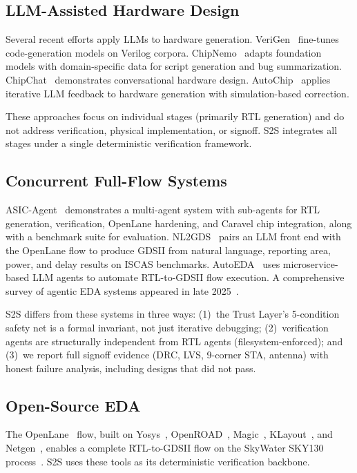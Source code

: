 \documentclass[journal]{IEEEtran}
\begin{document}
\subsection{LLM-Assisted Hardware Design}

Several recent efforts apply LLMs to hardware generation. VeriGen~\cite{thakur2024verigen} fine-tunes code-generation models on Verilog corpora. ChipNemo~\cite{liu2023chipnemo} adapts foundation models with domain-specific data for script generation and bug summarization. ChipChat~\cite{blocklove2023chipchat} demonstrates conversational hardware design. AutoChip~\cite{thakur2023autochip} applies iterative LLM feedback to hardware generation with simulation-based correction.

These approaches focus on individual stages (primarily RTL generation) and do not address verification, physical implementation, or signoff. S2S integrates all stages under a single deterministic verification framework.

\subsection{Concurrent Full-Flow Systems}

ASIC-Agent~\cite{asicagent2025} demonstrates a multi-agent system with sub-agents for RTL generation, verification, OpenLane hardening, and Caravel chip integration, along with a benchmark suite for evaluation. NL2GDS~\cite{nl2gds2026} pairs an LLM front end with the OpenLane flow to produce GDSII from natural language, reporting area, power, and delay results on ISCAS benchmarks. AutoEDA~\cite{autoeda2025} uses microservice-based LLM agents to automate RTL-to-GDSII flow execution. A comprehensive survey of agentic EDA systems appeared in late 2025~\cite{agenticseda2025}.

S2S differs from these systems in three ways: (1)~the Trust Layer's 5-condition safety net is a formal invariant, not just iterative debugging; (2)~verification agents are structurally independent from RTL agents (filesystem-enforced); and (3)~we report full signoff evidence (DRC, LVS, 9-corner STA, antenna) with honest failure analysis, including designs that did not pass.

\subsection{Open-Source EDA}

The OpenLane~\cite{openlane} flow, built on Yosys~\cite{yosys}, OpenROAD~\cite{openroad}, Magic~\cite{magic}, KLayout~\cite{klayout}, and Netgen~\cite{netgen}, enables a complete RTL-to-GDSII flow on the SkyWater SKY130 process~\cite{sky130}. S2S uses these tools as its deterministic verification backbone.
\end{document}
